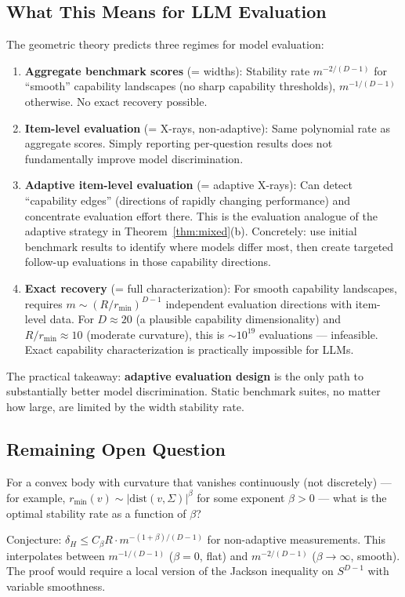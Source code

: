 \subsection{What This Means for LLM Evaluation}

The geometric theory predicts three regimes for model evaluation:

\begin{enumerate}
  \item \textbf{Aggregate benchmark scores} (= widths): Stability rate $m^{-2/(D-1)}$ for ``smooth'' capability landscapes (no sharp capability thresholds), $m^{-1/(D-1)}$ otherwise. No exact recovery possible.
  
  \item \textbf{Item-level evaluation} (= X-rays, non-adaptive): Same polynomial rate as aggregate scores. Simply reporting per-question results does not fundamentally improve model discrimination.
  
  \item \textbf{Adaptive item-level evaluation} (= adaptive X-rays): Can detect ``capability edges'' (directions of rapidly changing performance) and concentrate evaluation effort there. This is the evaluation analogue of the adaptive strategy in Theorem~\ref{thm:mixed}(b). Concretely: use initial benchmark results to identify where models differ most, then create targeted follow-up evaluations in those capability directions.
  
  \item \textbf{Exact recovery} (= full characterization): For smooth capability landscapes, requires $m \sim (R/r_{\min})^{D-1}$ independent evaluation directions with item-level data. For $D \approx 20$ (a plausible capability dimensionality) and $R/r_{\min} \approx 10$ (moderate curvature), this is $\sim 10^{19}$ evaluations --- infeasible. Exact capability characterization is practically impossible for LLMs.
\end{enumerate}

The practical takeaway: \textbf{adaptive evaluation design} is the only path to substantially better model discrimination. Static benchmark suites, no matter how large, are limited by the width stability rate.

\subsection{Remaining Open Question}

\begin{problem}
For a convex body with curvature that vanishes continuously (not discretely) --- for example, $r_{\min}(v) \sim |\mathrm{dist}(v, \Sigma)|^\beta$ for some exponent $\beta > 0$ --- what is the optimal stability rate as a function of $\beta$?

Conjecture: $\delta_H \leq C_\beta R \cdot m^{-(1+\beta)/(D-1)}$ for non-adaptive measurements. This interpolates between $m^{-1/(D-1)}$ ($\beta = 0$, flat) and $m^{-2/(D-1)}$ ($\beta \to \infty$, smooth). The proof would require a local version of the Jackson inequality on $S^{D-1}$ with variable smoothness.
\end{problem}
